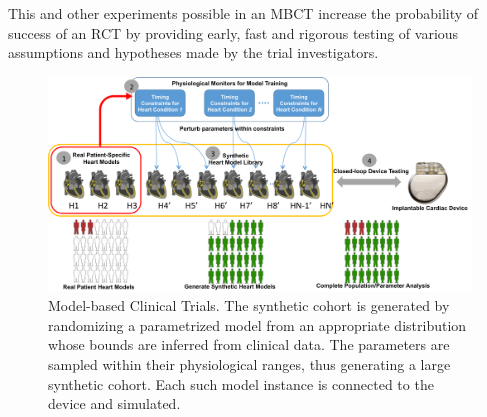 	
This and other experiments possible in an MBCT increase the probability of success of an RCT by providing early, fast and rigorous testing of various assumptions and hypotheses made by the trial investigators.
%

\begin{figure}[t]
	\centering
	\includegraphics[width=\textwidth]{figs/fig5mbct.png}
	\caption{\small Model-based Clinical Trials. The synthetic cohort is generated by randomizing a parametrized model from an appropriate distribution whose bounds are inferred from clinical data. The parameters are sampled within their physiological ranges, thus generating a large synthetic cohort. Each such model instance is connected to the device and simulated.}
	\label{fig:mbct}
\end{figure}

